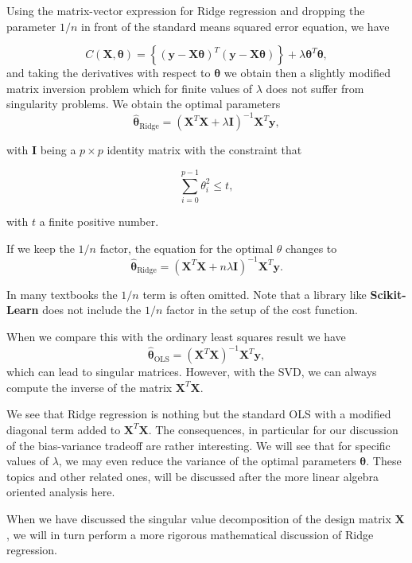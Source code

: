 \documentclass[%
oneside,                 %
final,                   %
10pt]{article}
\begin{document}
Using the matrix-vector expression for Ridge regression and dropping the parameter $1/n$ in front of the standard means squared error equation, we have

\[
C(\bm{X},\bm{\theta})=\left\{(\bm{y}-\bm{X}\bm{\theta})^T(\bm{y}-\bm{X}\bm{\theta})\right\}+\lambda\bm{\theta}^T\bm{\theta},
\]
and 
taking the derivatives with respect to $\bm{\theta}$ we obtain then
a slightly modified matrix inversion problem which for finite values
of $\lambda$ does not suffer from singularity problems. We obtain
the optimal parameters
\[
\hat{\bm{\theta}}_{\mathrm{Ridge}} = \left(\bm{X}^T\bm{X}+\lambda\bm{I}\right)^{-1}\bm{X}^T\bm{y},
\]

with $\bm{I}$ being a $p\times p$ identity matrix with the constraint that

\[
\sum_{i=0}^{p-1} \theta_i^2 \leq t,
\]

with $t$ a finite positive number. 

If we keep the $1/n$ factor, the equation for the optimal $\theta$ changes to
\[
\hat{\bm{\theta}}_{\mathrm{Ridge}} = \left(\bm{X}^T\bm{X}+n\lambda\bm{I}\right)^{-1}\bm{X}^T\bm{y}.
\]

In many textbooks the $1/n$ term is often omitted. Note that a library like \textbf{Scikit-Learn} does not include the $1/n$ factor in the setup of the cost function.

When we compare this with the ordinary least squares result we have
\[
\hat{\bm{\theta}}_{\mathrm{OLS}} = \left(\bm{X}^T\bm{X}\right)^{-1}\bm{X}^T\bm{y},
\]
which can lead to singular matrices. However, with the SVD, we can always compute the inverse of the matrix $\bm{X}^T\bm{X}$.

We see that Ridge regression is nothing but the standard OLS with a
modified diagonal term added to $\bm{X}^T\bm{X}$. The consequences, in
particular for our discussion of the bias-variance tradeoff are rather
interesting. We will see that for specific values of $\lambda$, we may
even reduce the variance of the optimal parameters $\bm{\theta}$. These topics and other related ones, will be discussed after the more linear algebra oriented analysis here.

When we have discussed the singular value decomposition of the design
matrix $\bm{X}$, we will in turn perform a more rigorous mathematical
discussion of Ridge regression.
\end{document}
